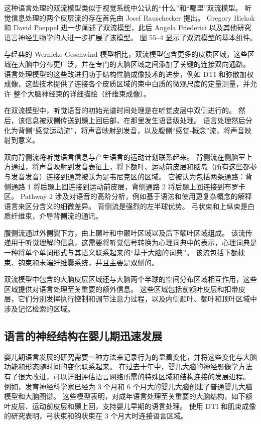 这种语言处理的双流模型类似于视觉系统中公认的“什么”和“哪里”双流模型。 听觉信息处理的两个皮层流的存在首先由 Josef Rauschecker 提出。 Gregory Hickok 和 David Poeppel 进一步阐述了双流模型，此后 Angela Friederici 以及其他研究语言神经生物学的人进一步扩展了该模型。 图 55–4 显示了双流模型的基本组件。

与经典的 Wernicke-Geschwind 模型相比，双流模型包含更多的皮质区域，这些区域在大脑中分布更广泛，并在专门的大脑区域之间添加了关键的连接双向通路。 语言处理模型的这些改进归功于结构性脑成像技术的进步，例如 DTI 和弥散加权成像，这些技术提供了连接各个皮质区域的束中白质的微观尺度的定量测量，并允许 整个大脑神经束的详细描绘（纤维束成像）。

在双流模型中，听觉语音的初始光谱时间处理是在听觉皮层中双侧进行的。 然后，该信息被双侧传送到颞上回后部，在那里发生语音级处理。 语言处理然后分化为背侧“感觉运动流”，将声音映射到发音，以及腹侧“感觉-概念”流，将声音映射到意义。

双向背侧流将听觉语言信息与产生语言的运动计划联系起来。 背侧流在侧脑室上方通过，将声音映射到发音表征上，将下额叶、运动前皮层和脑岛（所有这些都参与发音发音）连接到通常被认为是韦尼克区的区域。 它被认为包括两条通路：背侧通路 1 将后颞上回连接到运动前皮层，背侧通路 2 将后颞上回连接到布罗卡区。 Pathway 2 涉及对语音的高阶分析，例如基于语法和使用更复杂概念的解释语言来区分含义的细微差异。 背侧流是强烈的左半球优势。 弓状束和上纵束是白质纤维束，介导背侧流的通讯。

腹侧流通过外侧裂下方，由上颞叶和中颞叶区域以及后下额叶区域组成。 该流传递用于听觉理解的信息，这需要将听觉信号转换为心理词典中的表示，心理词典是一种将单个单词形式与其语义联系起来的“基于大脑的词典”。 该流包括下额枕束、钩束和末端纤维囊系统，并且主要是双侧的。

双流模型中包含的大脑皮层区域还与大脑两个半球的空间分布区域相互作用，这些区域提供对语言处理至关重要的额外信息。 这些区域包括前额叶皮层和扣带皮层，它们分别发挥执行控制和调节注意力过程，以及内侧颞叶、额叶和顶叶区域中涉及记忆检索的区域。



\subsection{语言的神经结构在婴儿期迅速发展}
婴儿期语言发展的研究需要一种方法来记录行为的显着变化，并将这些变化与大脑功能和形态随时间的变化联系起来。 在过去十年中，婴儿大脑的神经影像学方法有了很大改进，可以详细评估语言网络所需的特殊区域和结构连接的发展进程。 例如，发育神经科学家已经为 3 个月和 6 个月大的婴儿大脑创建了普通婴儿大脑模型和大脑图谱。 这些模型表明，对成年语言处理至关重要的大脑结构，如下额叶皮层、运动前皮层和颞上回，支持婴儿早期的语言处理。 使用 DTI 和肌束成像的研究表明，弓状束和钩状束在 3 个月大时连接语言区域。

